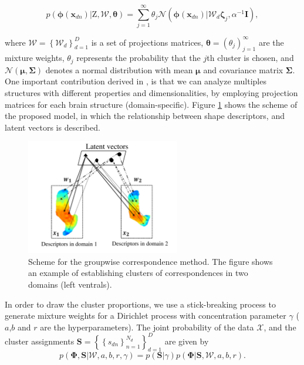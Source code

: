 \documentclass[]{article}
\newcommand{\Z}{\boldsymbol{\mathrm{Z}}}
\newcommand{\indobj}{\mathbf{x}_{dn}}
\newcommand{\projMat}{\boldsymbol{\mathcal{W}}_d}
\newcommand{\lvec}{\boldsymbol{\zeta}_j}
\newcommand{\phixnd}{\boldsymbol{\phi}\left(\indobj\right)}
\begin{document}
\begin{equation}
p\left( {{\phixnd}|{\Z},{\boldsymbol{\mathcal{W}}},{\boldsymbol{\theta }}} \right) = \sum\limits_{j = 1}^\infty  {{\theta _j}\mathcal{N}\left(\phixnd|\projMat\lvec,\alpha^{-1}\mathbf{I}\right)}, 
\label{eq:llNLmodel}
\end{equation}

where $\boldsymbol{\mathcal{W}} = \left\{\projMat\right\}_{d=1}^{D}$ is a set of projections
matrices, $\boldsymbol{\theta}=\left(\theta_j\right)_{j=1}^{\infty}$
are the mixture weights, $\theta_j$ represents the probability that
the $j$th cluster is chosen, and
$\mathcal{N}\left(\boldsymbol{\mu},\boldsymbol{\Sigma}\right)$ denotes
a normal distribution with mean $\boldsymbol{\mu}$ and covariance
matrix $\boldsymbol{\Sigma}$. One important contribution derived in \cite{Iwata13}, is that we can analyze multiples structures with different properties and dimensionalities, by employing projection matrices for each brain structure (domain-specific). Figure
\ref{fig:pipeline} shows the scheme of the proposed model, in which
the relationship between shape descriptors, and
latent vectors is described.

\begin{figure}[h!]
\centering
\includegraphics[width=0.6\textwidth]{img/pipelineGroupCorr}
\caption{Scheme for the groupwise correspondence method. The
  figure shows an example of establishing clusters of correspondences
  in two domains (left ventrals).}
\label{fig:pipeline}
\end{figure} 

In order to draw the cluster proportions, we use a stick-breaking process to generate mixture weights for a Dirichlet process with
concentration parameter $\gamma$ \cite{Iwata13} ($a$,$b$ and $r$ are the hyperparameters). The joint probability
of the data $\mathcal{X}$, and the cluster assignments
$\mathbf{S}=\left\{\left\{s_{dn}\right\}_{n=1}^{N_{d}}\right\}_{d=1}^{D}$
are given by
\begin{equation}
p\left(\boldsymbol{\Phi},\mathbf{S}|\boldsymbol{\mathcal{W}},a,b,r,\gamma\right)=
p\left(\mathbf{S}|\gamma\right)p\left(\boldsymbol{\Phi}|\mathbf{S},\boldsymbol{\mathcal{W}},a,b,r\right).
\label{eq:jointP}
\end{equation}
\end{document}
